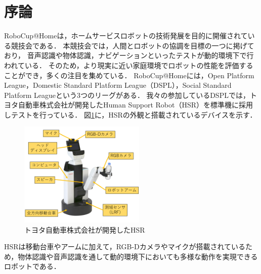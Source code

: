 \documentclass[a4j]{jarticle}
\begin{document}
\maketitle
\thispagestyle{empty}


\section{序論}
RoboCup@Home\cite{robocup_hp}は，ホームサービスロボットの技術発展を目的に開催されている競技会である．
本競技会では，人間とロボットの協調を目標の一つに掲げており，
音声認識や物体認識，ナビゲーションといったテストが動的環境下で行われている．
そのため，より現実に近い家庭環境でロボットの性能を評価することができ，多くの注目を集めている．
RoboCup@Homeには，Open Platform League，Domestic Standard Platform League（DSPL），Social Standard Platform Leagueという3つのリーグがある．
我々の参加しているDSPLでは，トヨタ自動車株式会社が開発したHuman Support Robot（HSR）\cite{hsr_paper}を標準機に採用しテストを行っている．
図\ref{overview_hsr}に，HSRの外観と搭載されているデバイスを示す．
\begin{figure}[ht]
  \centering
  \includegraphics[width=6cm]{images/hsr/hsr_explain_ja.png}
  \caption{トヨタ自動車株式会社が開発したHSR}
  \label{overview_hsr}
\end{figure}
HSRは移動台車やアームに加えて，RGB-Dカメラやマイクが搭載されているため，物体認識や音声認識を通して動的環境下においても多様な動作を実現できるロボットである．
\end{document}

